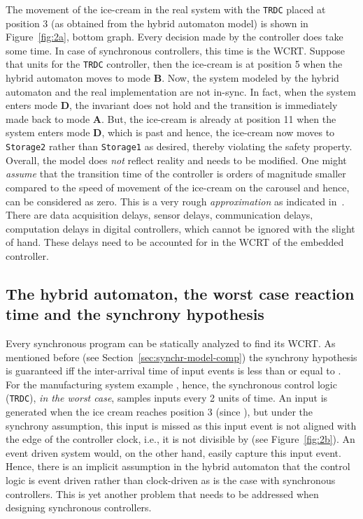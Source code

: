 \documentclass[10pt,journal,cspaper,compsoc]{IEEEtran}
\begin{document}
The movement of the ice-cream in the real system with the \texttt{TRDC}
placed at position 3 (as obtained from the hybrid automaton model) is
shown in Figure~\ref{fig:2a}, bottom graph. Every decision made by the
controller does take some time. In case of synchronous controllers, this
time is the WCRT. Suppose that  units for the \texttt{TRDC}
controller, then the ice-cream is at position 5 when the hybrid
automaton moves to mode \textbf{B}. Now, the system modeled by the
hybrid automaton and the real implementation are not in-sync. In fact,
when the system enters mode \textbf{D}, the invariant 
does not hold and the transition is immediately made back to mode
\textbf{A}. But, the ice-cream is already at position 11 when the system
enters mode \textbf{D}, which is past  and hence, the
ice-cream now moves to \texttt{Storage2} rather than \texttt{Storage1}
as desired, thereby violating the safety property. Overall, the model
does \textit{not} reflect reality and needs to be modified. One might
\textit{assume} that the transition time of the controller is orders of
magnitude smaller compared to the speed of movement of the ice-cream on
the carousel and hence, can be considered as zero. This is a very rough
\textit{approximation} as indicated
in~\cite{albert2004comparison}. There are data acquisition delays,
sensor delays, communication delays, computation delays in digital
controllers, which cannot be ignored with the slight of hand. These
delays need to be accounted for in the WCRT of the embedded controller.



\subsection{The hybrid automaton, the worst case reaction time and the
  synchrony hypothesis}
\label{sec:hybrid-model-worst-1}

Every synchronous program can be statically analyzed to find its
WCRT. As mentioned before (see Section~\ref{sec:synchr-model-comp}) the
synchrony hypothesis is guaranteed \textrm{iff} the inter-arrival time
of input events is less than or equal to . For the manufacturing
system example , hence, the synchronous control logic
(\texttt{TRDC}), \textit{in the worst case}, samples inputs every 2
units of time. An input is generated when the ice cream reaches position
3 (since ), but under the synchrony assumption, this input
is missed as this input event is not aligned with the edge of the
controller clock, i.e., it is not divisible by  (see
Figure~\ref{fig:2b}). An event driven system would, on the other hand,
easily capture this input event. Hence, there is an implicit assumption
in the hybrid automaton that the control logic is event driven rather
than clock-driven as is the case with synchronous controllers. This is
yet another problem that needs to be addressed when designing
synchronous controllers.
\end{document}
